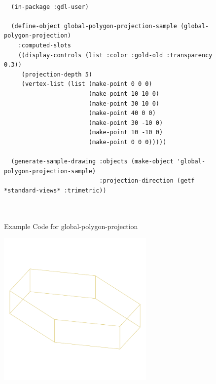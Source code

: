 \documentclass [11pt]{book}
\begin{document}
\begin{itemize}
\begin{description}
\end{description}




\begin{figure}
\begin{lrbox}{\boxedverb}
\begin{minipage}{\linewidth}
{\small

\begin{verbatim}

  (in-package :gdl-user)

  (define-object global-polygon-projection-sample (global-polygon-projection)
    :computed-slots
    ((display-controls (list :color :gold-old :transparency 0.3))
     (projection-depth 5)
     (vertex-list (list (make-point 0 0 0)
                        (make-point 10 10 0)
                        (make-point 30 10 0)
                        (make-point 40 0 0)
                        (make-point 30 -10 0)
                        (make-point 10 -10 0)
                        (make-point 0 0 0)))))

  (generate-sample-drawing :objects (make-object 'global-polygon-projection-sample)
                           :projection-direction (getf *standard-views* :trimetric))  

  
\end{verbatim}}
\end{minipage}
\end{lrbox}
\fbox{\usebox{\boxedverb}}

\caption{Example Code for global-polygon-projection}

\label{fig:example-code-global-polygon-projection}

\end{figure}

\begin{figure}
\begin{center}
\includegraphics[width=3in,height=3in]{../images/example-global-polygon-projection.pdf}
\end{center}


\end{figure}
\end{itemize}
\end{document}
